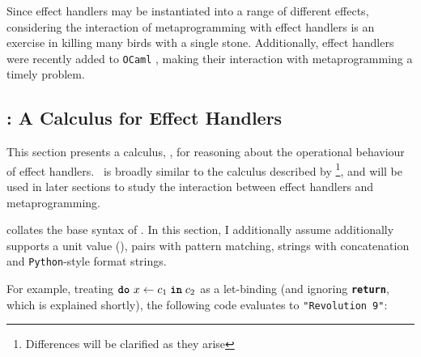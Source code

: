 


Since effect handlers may be instantiated into a range of different effects, considering the interaction of metaprogramming with effect handlers is an exercise in killing many birds with a single stone. Additionally, effect handlers were recently added to \texttt{OCaml} \citep{sivaramakrishnan-21}, making their interaction with metaprogramming a timely problem. 
\subsection{\texorpdfstring{\efflang{}}{Lambda-Op}: A Calculus for Effect Handlers}\label{subsection:effect-handler-calculus}
\newcommand{\print}[1]{\texttt{\textbf{print}}(\texttt{#1})}
\newcommand{\readInt}[1]{\texttt{\textbf{read\_int}(#1)}}


This section presents a calculus, \efflang{}, for reasoning about the operational behaviour of effect handlers.\ \efflang{} is broadly similar to the calculus described by \citet{pretnar-15} \footnote{Differences will be clarified as they arise}, and will be used in later sections to study the interaction between effect handlers and metaprogramming. 


 collates the base syntax of \efflang. In this section, I additionally assume \efflang{} additionally supports a unit value (), pairs with pattern matching, strings with concatenation and \texttt{Python}-style format strings. 

For example, treating $\texttt{\textbf{do}} \,\, {x} \leftarrow {c_1} \; \textbf{\texttt{in}} \; {c_2}$ as a let-binding (and ignoring \textbf{\texttt{return}}, which is explained shortly), the following code evaluates to \texttt{"Revolution 9"}:


